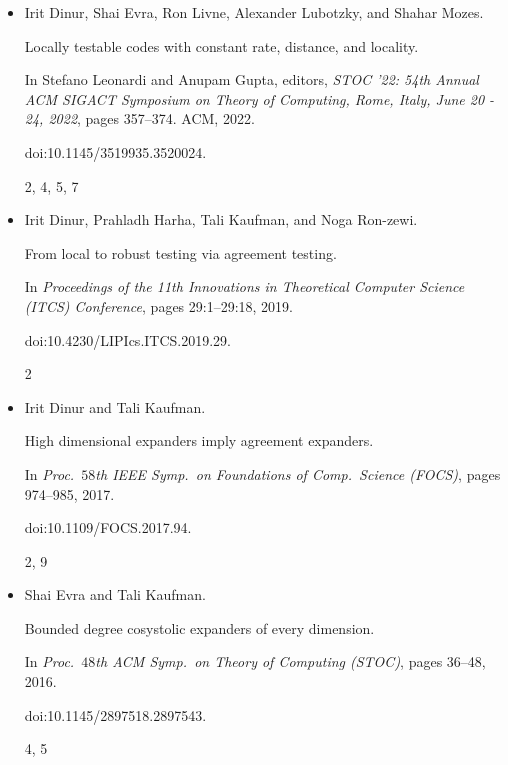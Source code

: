 \begin{itemize}
\emph{arXiv preprint}, 2020.


arXiv:2005.01045.


5




\item[] 
[6]

Irit Dinur, Shai Evra, Ron Livne, Alexander Lubotzky, and Shahar Mozes.


Locally testable codes with constant rate, distance, and locality.


In Stefano Leonardi and Anupam Gupta, editors, \emph{STOC ’22: 54th
Annual ACM SIGACT Symposium on Theory of Computing, Rome, Italy, June 20
- 24, 2022}, pages 357–374. ACM, 2022.


doi:10.1145/3519935.3520024.


2, 4, 5, 7




\item[] 
[7]

Irit Dinur, Prahladh Harha, Tali Kaufman, and Noga Ron-zewi.


From local to robust testing via agreement testing.


In \emph{Proceedings of the 11th Innovations in Theoretical Computer
Science (ITCS) Conference}, pages 29:1–29:18, 2019.


doi:10.4230/LIPIcs.ITCS.2019.29.


2




\item[] 
[8]

Irit Dinur and Tali Kaufman.


High dimensional expanders imply agreement expanders.


In \emph{Proc. $58$th IEEE Symp. on Foundations of Comp. Science
(FOCS)}, pages 974–985, 2017.


doi:10.1109/FOCS.2017.94.


2, 9




\item[] 
[9]

Shai Evra and Tali Kaufman.


Bounded degree cosystolic expanders of every dimension.


In \emph{Proc. $48$th ACM Symp. on Theory of Computing (STOC)},
pages 36–48, 2016.


doi:10.1145/2897518.2897543.


4, 5





\end{itemize}
